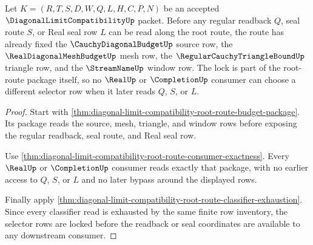 \begin{theorem}
\label{thm:diagonal-limit-compatibility-root-route-selector-lock}
Let $K=(R,T,S,D,W,Q,L,H,C,P,N)$ be an accepted $\DiagonalLimitCompatibilityUp$ packet. Before any regular readback $Q$, seal route $S$, or Real seal row $L$ can be read along the root route, the route has already fixed the $\CauchyDiagonalBudgetUp$ source row, the $\RealDiagonalMeshBudgetUp$ mesh row, the $\RegularCauchyTriangleBoundUp$ triangle row, and the $\StreamNameUp$ window row. The lock is part of the root-route package itself, so no $\RealUp$ or $\CompletionUp$ consumer can choose a different selector row when it later reads $Q$, $S$, or $L$.
\end{theorem}
\begin{proof}
Start with \autoref{thm:diagonal-limit-compatibility-root-route-budget-package}. Its package reads the source, mesh, triangle, and window rows before exposing the regular readback, seal route, and Real seal row.

Use \autoref{thm:diagonal-limit-compatibility-root-route-consumer-exactness}. Every $\RealUp$ or $\CompletionUp$ consumer reads exactly that package, with no earlier access to $Q$, $S$, or $L$ and no later bypass around the displayed rows.

Finally apply \autoref{thm:diagonal-limit-compatibility-root-route-classifier-exhaustion}. Since every classifier read is exhausted by the same finite row inventory, the selector rows are locked before the readback or seal coordinates are available to any downstream consumer.
\end{proof}

